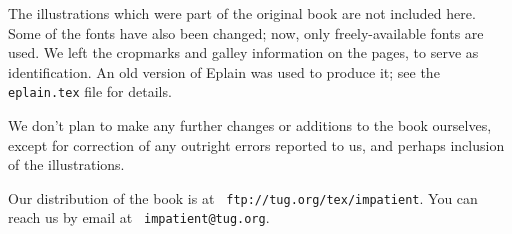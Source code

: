 The illustrations which were part of the original book are not included
here.  Some of the fonts have also been changed; now, only
freely-available fonts are used.  We left the cropmarks and galley
information on the pages, to serve as identification.  An old version of
Eplain was used to produce it; see the {\tt eplain.tex} file for
details.

We don't plan to make any further changes or additions to the book
ourselves, except for correction of any outright errors reported to us,
and perhaps inclusion of the illustrations.

Our distribution of the book is at {\tt
ftp://tug.org/tex/impatient}.  You can reach us by email at {\tt
impatient@tug.org}.

\pagebreak
\byebye
